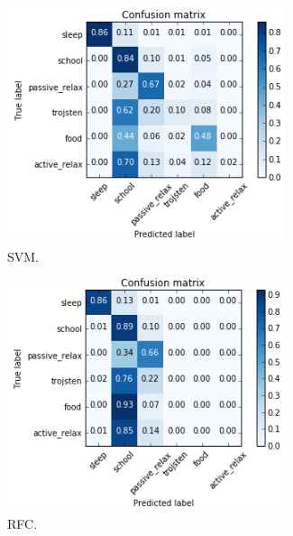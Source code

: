 \documentclass[a4paper, 12pt]{article}
\begin{document}
\begin{figure}[H]
\centering
\begin{subfigure}{.5\textwidth}
  \centering
  \includegraphics[width=1\linewidth]{cm1.png}
  \caption{SVM.}
\end{subfigure}%
\begin{subfigure}{.5\textwidth}
  \centering
  \includegraphics[width=1\linewidth]{cm2.png}
  \caption{RFC.}
\end{subfigure}
\begin{subfigure}{.5\textwidth}

\end{subfigure}
\end{figure}
\end{document}

